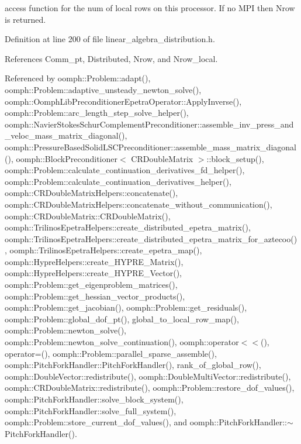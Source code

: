 access function for the num of local rows on this processor. If no M\+PI then Nrow is returned. 



Definition at line 200 of file linear\+\_\+algebra\+\_\+distribution.\+h.



References Comm\+\_\+pt, Distributed, Nrow, and Nrow\+\_\+local.



Referenced by oomph\+::\+Problem\+::adapt(), oomph\+::\+Problem\+::adaptive\+\_\+unsteady\+\_\+newton\+\_\+solve(), oomph\+::\+Oomph\+Lib\+Preconditioner\+Epetra\+Operator\+::\+Apply\+Inverse(), oomph\+::\+Problem\+::arc\+\_\+length\+\_\+step\+\_\+solve\+\_\+helper(), oomph\+::\+Navier\+Stokes\+Schur\+Complement\+Preconditioner\+::assemble\+\_\+inv\+\_\+press\+\_\+and\+\_\+veloc\+\_\+mass\+\_\+matrix\+\_\+diagonal(), oomph\+::\+Pressure\+Based\+Solid\+L\+S\+C\+Preconditioner\+::assemble\+\_\+mass\+\_\+matrix\+\_\+diagonal(), oomph\+::\+Block\+Preconditioner$<$ C\+R\+Double\+Matrix $>$\+::block\+\_\+setup(), oomph\+::\+Problem\+::calculate\+\_\+continuation\+\_\+derivatives\+\_\+fd\+\_\+helper(), oomph\+::\+Problem\+::calculate\+\_\+continuation\+\_\+derivatives\+\_\+helper(), oomph\+::\+C\+R\+Double\+Matrix\+Helpers\+::concatenate(), oomph\+::\+C\+R\+Double\+Matrix\+Helpers\+::concatenate\+\_\+without\+\_\+communication(), oomph\+::\+C\+R\+Double\+Matrix\+::\+C\+R\+Double\+Matrix(), oomph\+::\+Trilinos\+Epetra\+Helpers\+::create\+\_\+distributed\+\_\+epetra\+\_\+matrix(), oomph\+::\+Trilinos\+Epetra\+Helpers\+::create\+\_\+distributed\+\_\+epetra\+\_\+matrix\+\_\+for\+\_\+aztecoo(), oomph\+::\+Trilinos\+Epetra\+Helpers\+::create\+\_\+epetra\+\_\+map(), oomph\+::\+Hypre\+Helpers\+::create\+\_\+\+H\+Y\+P\+R\+E\+\_\+\+Matrix(), oomph\+::\+Hypre\+Helpers\+::create\+\_\+\+H\+Y\+P\+R\+E\+\_\+\+Vector(), oomph\+::\+Problem\+::get\+\_\+eigenproblem\+\_\+matrices(), oomph\+::\+Problem\+::get\+\_\+hessian\+\_\+vector\+\_\+products(), oomph\+::\+Problem\+::get\+\_\+jacobian(), oomph\+::\+Problem\+::get\+\_\+residuals(), oomph\+::\+Problem\+::global\+\_\+dof\+\_\+pt(), global\+\_\+to\+\_\+local\+\_\+row\+\_\+map(), oomph\+::\+Problem\+::newton\+\_\+solve(), oomph\+::\+Problem\+::newton\+\_\+solve\+\_\+continuation(), oomph\+::operator$<$$<$(), operator=(), oomph\+::\+Problem\+::parallel\+\_\+sparse\+\_\+assemble(), oomph\+::\+Pitch\+Fork\+Handler\+::\+Pitch\+Fork\+Handler(), rank\+\_\+of\+\_\+global\+\_\+row(), oomph\+::\+Double\+Vector\+::redistribute(), oomph\+::\+Double\+Multi\+Vector\+::redistribute(), oomph\+::\+C\+R\+Double\+Matrix\+::redistribute(), oomph\+::\+Problem\+::restore\+\_\+dof\+\_\+values(), oomph\+::\+Pitch\+Fork\+Handler\+::solve\+\_\+block\+\_\+system(), oomph\+::\+Pitch\+Fork\+Handler\+::solve\+\_\+full\+\_\+system(), oomph\+::\+Problem\+::store\+\_\+current\+\_\+dof\+\_\+values(), and oomph\+::\+Pitch\+Fork\+Handler\+::$\sim$\+Pitch\+Fork\+Handler().

